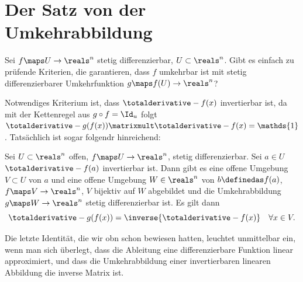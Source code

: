 \section*{Der Satz von der Umkehrabbildung}
Sei \( f\maps U\to \reals^n \) stetig differenzierbar, \( U\subset \reals^n \). Gibt es einfach zu prüfende Kriterien, die garantieren, dass \( f \) umkehrbar ist mit stetig differenzierbarer Umkehrfunktion \( g\maps f(U)\to \reals^n \)?

Notwendiges Kriterium ist, dass \( \totalderivative-{f}(x) \) invertierbar ist, da mit der Kettenregel aus \( g\circ f=\Id_u \) folgt \( \totalderivative-{g}(f(x))\matrixmult \totalderivative-{f}(x)=\mathds{1} \). Tatsächlich ist sogar folgendr hinreichend:

\begin{satz}\label{satz_von_der_umkehrabbildung}
  Sei \( U\subset \reals^n \) offen, \( f\maps U\to \reals^n \), stetig differenzierbar. Sei \( a\in U \) \sd \( \totalderivative-{f}(a) \) invertierbar ist. Dann gibt es eine offene Umgebung \( V\subset U \) von \( a \) und eine offene Umgebung \( W\in \reals^n \) von \( b\definedas f(a) \), \sd \( f\maps V\to \reals^n \), \( V \) bijektiv auf \( W \) abgebildet und die Umkehrabbildung \( g\maps W\to \reals^n \) stetig differenzierbar ist. Es gilt dann
  \begin{equation*}
    \totalderivative-{g}(f(x))=\inverse{\totalderivative-{f}(x)}\quad \forall x\in V.
  \end{equation*}
\end{satz}
\begin{bemerkung*}
  Die letzte Identität, die wir obn schon bewiesen hatten, leuchtet unmittelbar ein, wenn man sich überlegt, dass die Ableitung eine differenzierbare Funktion linear approximiert, und dass die Umkehrabbildung einer invertierbaren linearen Abbildung die inverse Matrix ist.
\end{bemerkung*}
